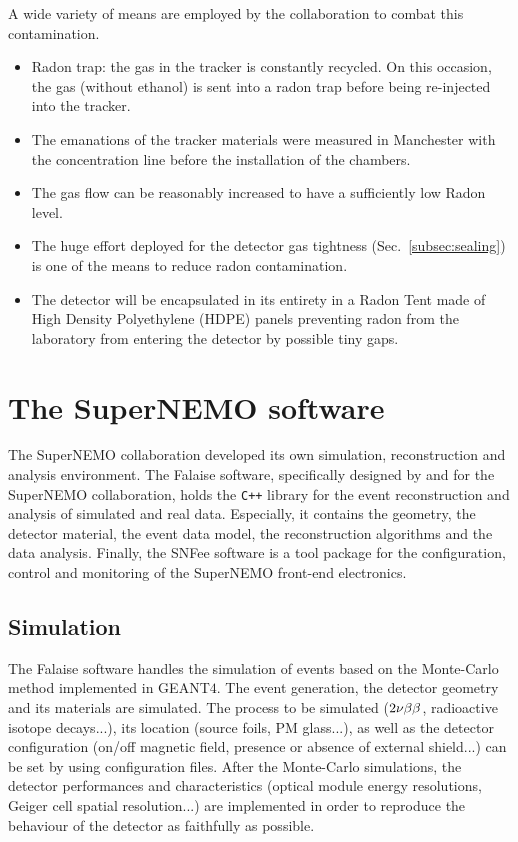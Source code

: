 A wide variety of means are employed by the collaboration to combat this contamination.
\begin{itemize}
\item Radon trap: the gas in the tracker is constantly recycled.
  On this occasion, the gas (without ethanol) is sent into a radon trap before being re-injected into the tracker.
\item The emanations of the tracker materials were measured in Manchester with the concentration line before the installation of the chambers.
\item The gas flow can be reasonably increased to have a sufficiently low Radon level.
\item The huge effort deployed for the detector gas tightness (Sec.~\ref{subsec:sealing}) is one of the means to reduce radon contamination.
\item The detector will be encapsulated in its entirety in a Radon Tent made of High Density Polyethylene (HDPE) panels preventing radon from the laboratory from entering the detector by possible tiny gaps.
\end{itemize}


\section{The SuperNEMO software}
\label{sec:SNsoftware}

The SuperNEMO collaboration developed its own simulation, reconstruction and analysis environment.
The Falaise software, specifically designed by and for the SuperNEMO collaboration, holds the \verb!C++! library for the event reconstruction and analysis of simulated and real data.
Especially, it contains the geometry, the detector material, the event data model, the reconstruction algorithms and the data analysis.
Finally, the SNFee software is a tool package for the configuration, control and monitoring of the SuperNEMO front-end electronics.


\subsection{Simulation}

The Falaise software handles the simulation of events based on the Monte-Carlo method implemented in GEANT$4$.
The event generation, the detector geometry and its materials are simulated.
The process to be simulated ($2\nu\beta\beta$, radioactive isotope decays...), its location (source foils, PM glass...), as well as the detector configuration (on/off magnetic field, presence or absence of external shield...) can be set by using configuration files.
After the Monte-Carlo simulations, the detector performances and characteristics (optical module energy resolutions, Geiger cell spatial resolution...) are implemented in order to reproduce the behaviour of the detector as faithfully as possible.


